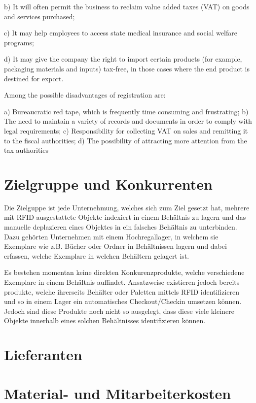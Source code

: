 b) It will often permit the business to reclaim value added taxes (VAT) on goods and services purchased;

c) It may help employees to access state medical insurance and social welfare programs;

d) It may give the company the right to import certain products (for example, packaging materials and inputs) tax-free, in those cases where the end product is destined for export.

Among the possible disadvantages of registration are:

a) Bureaucratic red tape, which is frequently time consuming and frustrating;
b) The need to maintain a variety of records and documents in order to comply with legal requirements;
c) Responsibility for collecting VAT on sales and remitting it to the fiscal authorities;
d) The possibility of attracting more attention from the tax authorities

\section{Zielgruppe und Konkurrenten}
Die Zielguppe ist jede Unternehmung, welches sich zum Ziel gesetzt hat, mehrere mit RFID ausgestattete Objekte indexiert in einem Behältnis zu lagern und das manuelle deplazieren eines Objektes in ein falsches Behältnis zu unterbinden.
Dazu gehörten Unternehmen mit einem Hochregallager, in welchem sie Exemplare wie z.B. Bücher oder Ordner in Behältnissen lagern und dabei erfassen, welche Exemplare in welchen Behältern gelagert ist.

Es bestehen momentan keine direkten Konkurenzprodukte, welche verschiedene Exemplare in einem Behältnis auffindet. Ansatzweise existieren jedoch bereits produkte, welche ihrerseits Behälter oder Paletten mittels RFID identifizieren und so in einem Lager ein automatisches Checkout/Checkin umsetzen können. Jedoch sind diese Produkte noch nicht so ausgelegt, dass diese viele kleinere Objekte innerhalb eines solchen Behältnisses identifizieren können.   

\section{Lieferanten}

\section{Material- und Mitarbeiterkosten}
